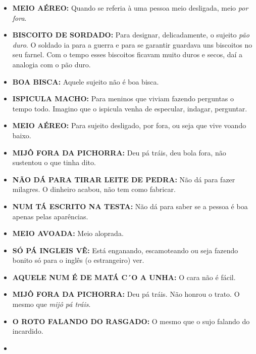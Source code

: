 \documentclass[12pt,brazil,]{book}
\providecommand{\tightlist}{%
  \setlength{\itemsep}{0pt}\setlength{\parskip}{0pt}}
\begin{document}
\begin{itemize}
\tightlist
\item
  \textbf{MEIO AÉREO:} Quando se referia à uma pessoa meio desligada,
  meio \emph{por fora}.\\
\item
  \textbf{BISCOITO DE SORDADO:} Para designar, delicadamente, o sujeito
  \emph{pão duro}. O soldado ia para a guerra e para se garantir
  guardava uns biscoitos no seu farnel. Com o tempo esses biscoitos
  ficavam muito duros e secos, daí a analogia com o pão duro.\\
\item
  \textbf{BOA BISCA:} Aquele sujeito não é boa bisca.\\
\item
  \textbf{ISPICULA MACHO:} Para meninos que viviam fazendo perguntas o
  tempo todo. Imagino que o ispicula venha de especular, indagar,
  perguntar.\\
\item
  \textbf{MEIO AÉREO:} Para sujeito desligado, por fora, ou seja que
  vive voando baixo.\\
\item
  \textbf{MIJÔ FORA DA PICHORRA:} Deu pá tráis, deu bola fora, não
  sustentou o que tinha dito.\\
\item
  \textbf{NÃO DÁ PARA TIRAR LEITE DE PEDRA:} Não dá para fazer milagres.
  O dinheiro acabou, não tem como fabricar.\\
\item
  \textbf{NUM TÁ ESCRITO NA TESTA:} Não dá para saber se a pessoa é boa
  apenas pelas aparências.\\
\item
  \textbf{MEIO AVOADA:} Meio aloprada.\\
\item
  \textbf{SÓ PÁ INGLEIS VÊ:} Está enganando, escamoteando ou seja
  fazendo bonito só para o inglês (o estrangeiro) ver.\\
\item
  \textbf{AQUELE NUM É DE MATÁ C´O A UNHA:} O cara não é fácil.\\
\item
  \textbf{MIJÔ FORA DA PICHORRA:} Deu pá tráis. Não honrou o trato. O
  mesmo que \emph{mijô pá tráis}.\\
\item
  \textbf{O ROTO FALANDO DO RASGADO:} O mesmo que o sujo falando do
  incardido.\\
\item

\end{itemize}
\end{document}
